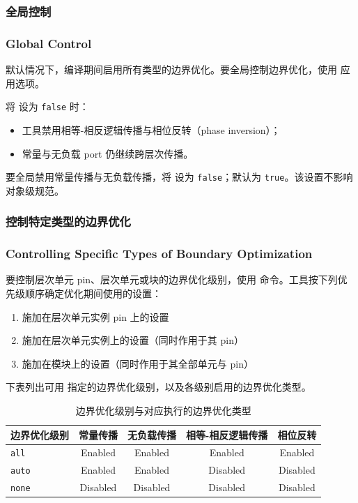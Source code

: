 \subsubsection{全局控制}
\subsubsection*{Global Control}

默认情况下，编译期间启用所有类型的边界优化。要全局控制边界优化，使用  应用选项。

将  设为 \texttt{false} 时：
\begin{itemize}
  \item 工具禁用相等-相反逻辑传播与相位反转（phase inversion）；
  \item 常量与无负载 port 仍继续跨层次传播。
\end{itemize}

要全局禁用常量传播与无负载传播，将  设为 \texttt{false}；默认为 \texttt{true}。该设置不影响对象级规范。

\subsubsection{控制特定类型的边界优化}
\subsubsection*{Controlling Specific Types of Boundary Optimization}

要控制层次单元 pin、层次单元或块的边界优化级别，使用  命令。工具按下列优先级顺序确定优化期间使用的设置：
\begin{enumerate}
  \item 施加在层次单元实例 pin 上的设置
  \item 施加在层次单元实例上的设置（同时作用于其 pin）
  \item 施加在模块上的设置（同时作用于其全部单元与 pin）
\end{enumerate}

下表列出可用  指定的边界优化级别，以及各级别启用的边界优化类型。

\begin{table}[htbp]
\centering
\caption{边界优化级别与对应执行的边界优化类型}
\label{tab:boundary-opt-levels}
\small
\begin{tabularx}{\textwidth}{@{}l cccc@{}}
\toprule
\textbf{边界优化级别} & \textbf{常量传播} & \textbf{无负载传播} & \textbf{相等-相反逻辑传播} & \textbf{相位反转} \\
\midrule
\texttt{all}  & Enabled & Enabled & Enabled & Enabled \\
\texttt{auto} & Enabled & Enabled & Disabled & Disabled \\
\texttt{none} & Disabled & Disabled & Disabled & Disabled \\
\bottomrule
\end{tabularx}
\end{table}

